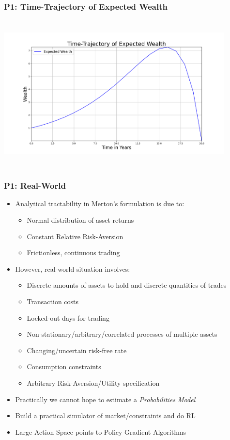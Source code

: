 \documentclass[handout]{beamer}
\begin{document}
\begin{frame}
\frametitle{P1: Time-Trajectory of Expected Wealth}
\includegraphics[width=12cm, height=8cm]{../finance/cme241/wealth_trajectory.png}
\end{frame}

\begin{frame}
\frametitle{P1: Real-World}
\pause
\begin{itemize}[<+->]
\item Analytical tractability in Merton's formulation is due to:
\begin{itemize}
\item Normal distribution of asset returns
\item Constant Relative Risk-Aversion
\item Frictionless, continuous trading
\end{itemize}
\item However, real-world situation involves:
\begin{itemize}
\item Discrete amounts of assets to hold and discrete quantities of trades
\item Transaction costs
\item Locked-out days for trading
\item Non-stationary/arbitrary/correlated processes of multiple assets
\item Changing/uncertain risk-free rate
\item Consumption constraints
\item Arbitrary Risk-Aversion/Utility specification
\end{itemize}
\item Practically we cannot hope to estimate a {\em Probabilities Model}
\item Build a practical simulator of market/constraints and do RL
\item Large Action Space points to Policy Gradient Algorithms
\end{itemize}
\end{frame}
\end{document}
